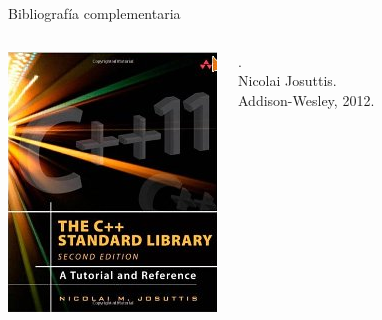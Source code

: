 \begin{frame}[t]{Bibliografía complementaria}
\begin{columns}
\includegraphics[width=\linewidth]{images/cpp-lib-2e.png}

.\\
Nicolai Josuttis.\\
Addison-Wesley, 2012.

\end{columns}

\end{frame}
